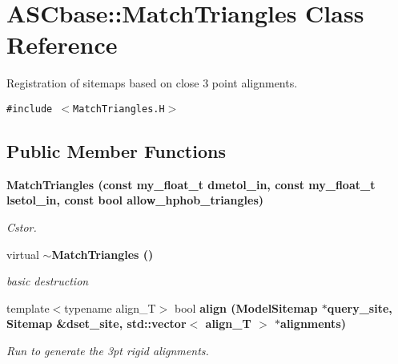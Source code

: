 \section{ASCbase::Match\-Triangles Class Reference}
\label{classASCbase_1_1MatchTriangles}
Registration of sitemaps based on close 3 point alignments.  


{\tt \#include $<$Match\-Triangles.H$>$}

\subsection*{Public Member Functions}
\begin{CompactItemize}
\item 
\bf{Match\-Triangles} (const my\_\-float\_\-t dmetol\_\-in, const my\_\-float\_\-t lsetol\_\-in, const bool allow\_\-hphob\_\-triangles)
\begin{CompactList}\small\item\em Cstor. \item\end{CompactList}\item 
virtual \bf{$\sim$Match\-Triangles} ()\label{classASCbase_1_1MatchTriangles_2c1b59400cb3b11d304f8ac9fe4446e1}

\begin{CompactList}\small\item\em basic destruction \item\end{CompactList}\item 
template$<$typename align\_\-T$>$ bool \bf{align} (\bf{Model\-Sitemap} $\ast$query\_\-site, \bf{Sitemap} \&dset\_\-site, std::vector$<$ align\_\-T $>$ $\ast$alignments)
\begin{CompactList}\small\item\em Run to generate the 3pt rigid alignments. \item\end{CompactList}\end{CompactItemize}

